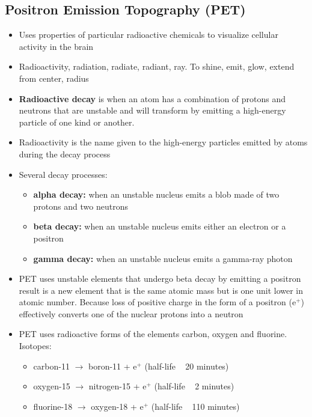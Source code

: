\documentclass{article}
\begin{document}
\subsection{Positron Emission Topography (PET)}
\begin{itemize}
    \item Uses properties of particular radioactive chemicals to visualize cellular activity in the brain
    \item Radioactivity, radiation, radiate, radiant, ray. To shine, emit, glow, extend from center, radius
    \item \textbf{Radioactive decay} is when an atom has a combination of protons and neutrons that are unstable and will transform by emitting a high-energy particle of one kind or another.
    \item Radioactivity is the name given to the high-energy particles emitted by atoms during the decay process
    \item Several decay processes: 
        \begin{itemize}
            \item \textbf{alpha decay:} when an unstable nucleus emits a blob made of two protons and two neutrons
            \item \textbf{beta decay:} when an unstable nucleus emits either an electron or a positron
            \item \textbf{gamma decay:} when an unstable nucleus emits a gamma-ray photon
        \end{itemize}
    \item PET uses unstable elements that undergo beta decay by emitting a positron
        \subitem result is a new element that is the same atomic mass but is one unit lower in atomic number. Because loss of positive charge in the form of a positron (e$^+$) effectively converts one of the nuclear protons into a neutron
    \item PET uses radioactive forms of the elements carbon, oxygen and fluorine. \\ Isotopes:
        \begin{itemize}
            \item carbon-11 $\rightarrow$ boron-11 + e$^+$ (half-life ~ 20 minutes)
            \item oxygen-15 $\rightarrow$ nitrogen-15 + e$^+$ (half-life ~ 2 minutes)
            \item fluorine-18 $\rightarrow$ oxygen-18 + e$^+$ (half-life ~ 110 minutes) 
        \end{itemize}

\end{itemize}
\end{document}
